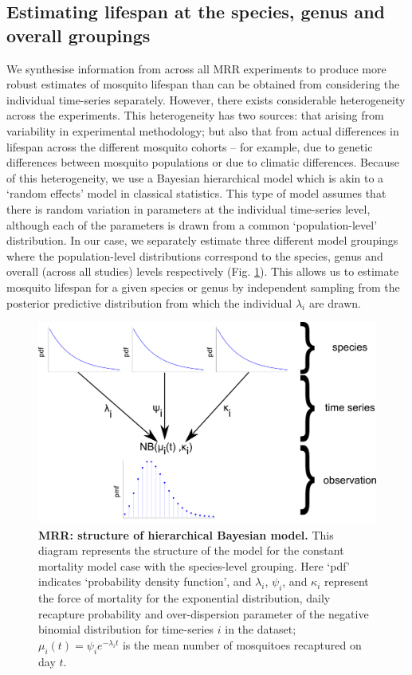 \documentclass[12pt]{article}
\begin{document}
\subsection{Estimating lifespan at the species, genus and overall groupings}\label{sec:MRR_hierarchical}
We synthesise information from across all MRR experiments to produce more robust estimates of mosquito lifespan than can be obtained from considering the individual time-series separately. However, there exists considerable heterogeneity across the experiments. This heterogeneity has two sources: that arising from variability in experimental methodology; but also that from actual differences in lifespan across the different mosquito cohorts -- for example, due to genetic differences between mosquito populations or due to climatic differences. Because of this heterogeneity, we use a Bayesian hierarchical model which is akin to a `random effects' model in classical statistics. This type of model assumes that there is random variation in parameters at the individual time-series level, although each of the parameters is drawn from a common `population-level' distribution. In our case, we separately estimate three different model groupings where the population-level distributions correspond to the species, genus and overall (across all studies) levels respectively (Fig. \ref{fig:mrr_methodDiagramHierarchy}). This allows us to estimate mosquito lifespan for a given species or genus by independent sampling from the posterior predictive distribution from which the individual $\lambda_i$ are drawn.


\begin{figure}[h]
	\centerline{\includegraphics[width=1\textwidth]{./Figure_files/mrr_methodDiagramHierarchy.pdf}}
	\caption{\textbf{MRR: structure of hierarchical Bayesian model.} This diagram represents the structure of the model for the constant mortality model case with the species-level grouping. Here `pdf' indicates `probability density function', and $\lambda_i$, $\psi_i$, and $\kappa_i$ represent the force of mortality for the exponential distribution, daily recapture probability and over-dispersion parameter of the negative binomial distribution for time-series $i$ in the dataset; $\mu_i(t)= \psi_i e^{-\lambda_i t}$ is the mean number of mosquitoes recaptured on day $t$.}
	\label{fig:mrr_methodDiagramHierarchy}
\end{figure}
\end{document}
